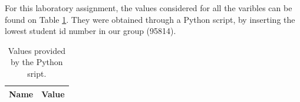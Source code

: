 
\vspace{1cm}

For this laboratory assignment, the values considered for all the varibles can be
found on Table \ref{tab:given_vls}. They were obtained through a Python script, by
inserting the lowest student id number in our group (95814). 

\begin{table}[h]
	\centering
	\begin{tabular}{|l|r|}
		\hline    
		{\bf Name} & {\bf Value} \\ \hline
    		
	\end{tabular}
	
	\caption{Values provided by the Python sript.}
    
\label{tab:given_vls}
\end{table}
